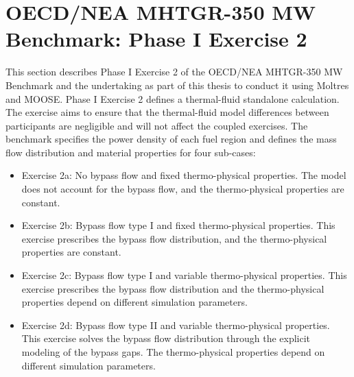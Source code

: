

\section{OECD/NEA MHTGR-350 MW Benchmark: Phase I Exercise 2}
\label{sec:ph1ex2}

This section describes Phase I Exercise 2 of the OECD/NEA MHTGR-350 MW Benchmark \cite{oecd_nea_benchmark_2017} and the undertaking as part of this thesis to conduct it using Moltres and MOOSE.
Phase I Exercise 2 defines a thermal-fluid standalone calculation.
The exercise aims to ensure that the thermal-fluid model differences between participants are negligible and will not affect the coupled exercises.
The benchmark specifies the power density of each fuel region and defines the mass flow distribution and material properties for four sub-cases:
\begin{itemize}
  \item Exercise 2a: No bypass flow and fixed thermo-physical properties. The model does not account for the bypass flow, and the thermo-physical properties are constant.
  \item Exercise 2b: Bypass flow type I and fixed thermo-physical properties. This exercise prescribes the bypass flow distribution, and the thermo-physical properties are constant.
  \item Exercise 2c: Bypass flow type I and variable thermo-physical properties. This exercise prescribes the bypass flow distribution and the thermo-physical properties depend on different simulation parameters.
  \item Exercise 2d: Bypass flow type II and variable thermo-physical properties. This exercise solves the bypass flow distribution through the explicit modeling of the bypass gaps. The thermo-physical properties depend on different simulation parameters.
\end{itemize}


